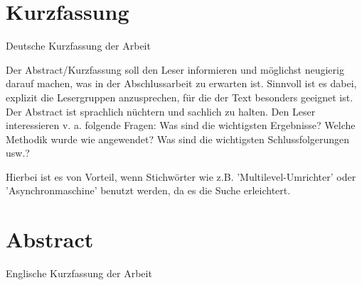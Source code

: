 \thispagestyle{empty}
\section*{Kurzfassung} 
Deutsche Kurzfassung der Arbeit

Der Abstract/Kurzfassung soll den Leser informieren und möglichst neugierig darauf machen, was in der Abschlussarbeit zu erwarten ist. Sinnvoll ist es dabei, explizit die Lesergruppen anzusprechen, für die der Text besonders geeignet ist. Der Abstract ist sprachlich nüchtern und sachlich zu halten. Den Leser interessieren v. a. folgende Fragen: Was sind die wichtigsten Ergebnisse? Welche Methodik wurde wie angewendet? Was sind die wichtigsten Schlussfolgerungen usw.?

Hierbei ist es von Vorteil, wenn Stichwörter wie z.B. 'Multilevel-Umrichter' oder 'Asynchronmaschine' benutzt werden, da es die Suche erleichtert.

\section*{Abstract}
Englische Kurzfassung der Arbeit

\null\newpage
\thispagestyle{empty}
\newpage
\cleardoublepage